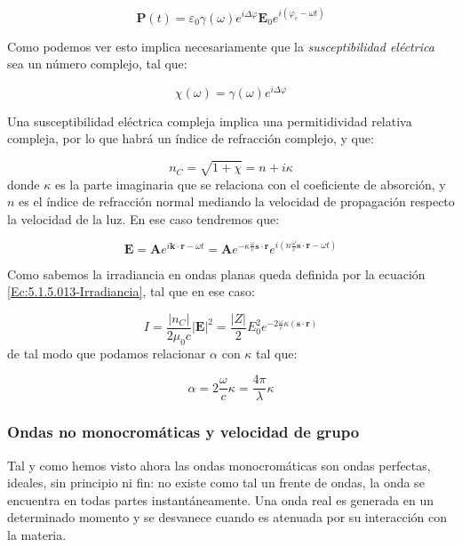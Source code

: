 \documentclass[12pt]{article}
\newcommand{\parentesis}[1]{\left( #1  \right)}
\newcommand{\En}{\mathbf{E}}
\newcommand{\kn}{\mathbf{k}}
\newcommand{\rn}{\mathbf{r}}
\newcommand{\An}{\mathbf{A}}
\newcommand{\Pn}{\mathbf{P}}
\newcommand{\sn}{\mathbf{s}}
\numberwithin{equation}{section}
\numberwithin{figure}{section}
\begin{document}
\begin{equation}
\Pn (t) =  \varepsilon_0 \gamma (\omega) e^{i \Delta \varphi} \En_0 e^{i (\varphi_e - \omega t)}
\end{equation}

Como podemos ver esto implica necesariamente que la \textit{susceptibilidad eléctrica} sea un número complejo, tal que:

\begin{equation}
\chi (\omega) = \gamma (\omega) e^{i \Delta \varphi}
\end{equation}

Una susceptibilidad eléctrica compleja implica una permitidividad relativa compleja, por lo que habrá un índice de refracción complejo, y que:

\begin{equation}
n_C = \sqrt{1+\chi} = n + i \kappa
\end{equation}
donde $\kappa$ es la parte imaginaria que se relaciona con el coeficiente de absorción, y $n$ es el índice de refracción normal mediando la velocidad de propagación respecto la velocidad de la luz. En ese caso tendremos que:

\begin{equation}
\En = \An e^{i \kn \cdot \rn - \omega t} = \An e^{-\kappa \frac{\omega}{c} \sn \cdot \rn} e^{i \parentesis{n \frac{\omega}{c} \sn \cdot \rn - \omega t}}
\end{equation}

Como sabemos la irradiancia en ondas planas queda definida por la ecuación \ref{Ec:5.1.5.013-Irradiancia}, tal que en ese caso:

\begin{equation}
I = \dfrac{|n_C|}{2 \mu_0 c} |\En|^2  = \dfrac{|Z|}{2} E_0^2 e^{-2 \frac{\omega}{c} \kappa ( \sn \cdot \rn)}
\end{equation}
de tal modo que podamos relacionar $\alpha$ con $\kappa$ tal que:

\begin{equation}
\alpha = 2 \dfrac{\omega}{c} \kappa = \dfrac{4 \pi}{\lambda
} \kappa
\end{equation}

\subsubsection{Ondas no monocromáticas y velocidad de grupo}

Tal y como hemos visto ahora las ondas monocromáticas son ondas perfectas, ideales, sin principio ni fin: no existe como tal un frente de ondas, la onda se encuentra en todas partes instantáneamente. Una onda real es generada en un determinado momento y se desvanece cuando es atenuada por su interacción con la materia.  \\
\end{document}
